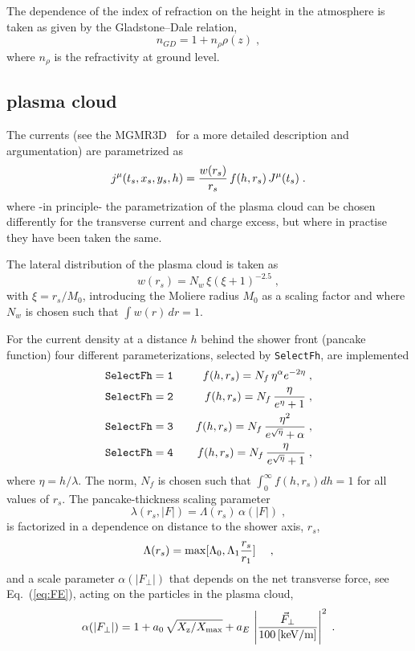 \documentclass[pdftex,dvipsnames,usenames,fleqn,12pt]{article}
\def\beq{\begin{equation}}
\def\eeq{\end{equation} }
\def\bea{\begin{eqnarray}}
\def\eea{\end{eqnarray}}
\def\eqref#1{Eq.~(\ref{eq:#1})}
\def\eqlab#1{\label{eq:#1}}
\def\Xmax{X_{\rm max}}
\def\Xrh{X_{\rm z}}
\begin{document}
The dependence of the index of refraction on the height in the atmosphere is taken as given by the Gladstone--Dale relation,
\beq
n_{GD}=1+n_\rho \rho(z) \;, \eqlab{GD}
\eeq
where $n_\rho$ is the refractivity at ground level.

\subsection{plasma cloud}
The currents (see the MGMR3D~\cite{MGMR3D} for a more detailed description and argumentation) are parametrized as
\beq
j^\mu(t_s,x_s,y_s,h)={w(r_s) \over r_s} \, f(h,r_s) \, J^\mu(t_s) \;.
\eqlab{DefCloud}
\eeq
where -in principle- the parametrization of the plasma cloud can be chosen differently for the transverse current and charge excess, but where in practise they have been taken the same.

The lateral distribution of the plasma cloud is taken as
\beq
w(r_s)=N_w\,\xi (\xi+1)^{-2.5} \;,
\eqlab{Def-w}
\eeq
with $\xi=r_s/M_0$, introducing the Moliere radius $M_0$ as a scaling factor and where $N_w$ is chosen such that $\int w(r)\, dr=1$.

For the current density at a distance $h$ behind the shower front (pancake function) four different parameterizations, selected by {\tt SelectFh}, are implemented
\bea
{\tt SelectFh=1} &\quad& f(h,r_s)=N_f\, \eta^{\alpha} e^{-2\eta} \;, \\ %
{\tt SelectFh=2} &\quad& f(h,r_s)=N_f\, {\eta \over e^{\eta} + 1 } \;, \\ %
{\tt SelectFh=3} &\quad& f(h,r_s)=N_f\, {\eta^{2} \over e^{\sqrt{\eta}} + \alpha } \;, \\ %
{\tt SelectFh=4} &\quad& f(h,r_s)=N_f\, {\eta \over e^{\sqrt{\eta}} + 1}\;,  %
\eqlab{Def-f}
\eea
where $\eta={h/ \lambda}$.  The norm, $N_f$ is chosen such that $\int_0^\infty f(h,r_s) dh=1$ for all values of $r_s$.
The pancake-thickness scaling parameter
\beq
\lambda(r_s,|F|)= \Lambda(r_s) \, \alpha(|F|) \;,
\eqlab{Def-lam}
\eeq
is factorized in a dependence on distance to the shower axis, $r_s$,
\beq
\Lambda(r_s)= \max[\Lambda_0, \Lambda_1 {r_s\over r_1} ] \quad \;,
\eqlab{Def-lamr}
\eeq
and a scale parameter $\alpha(|F_\perp|)$ that depends on the net transverse force, see \eqref{FE}, acting on the particles in the plasma cloud,
\beq
\alpha(|F_\perp|)= 1 + a_0 \, \sqrt{\Xrh/\Xmax}
                    + a_E \, \left| {\vec{F}_\perp \over 100\, {\rm [keV/m]}} \right|^2 \;.
\eqlab{Def-alphaE}
\eeq
\end{document}
